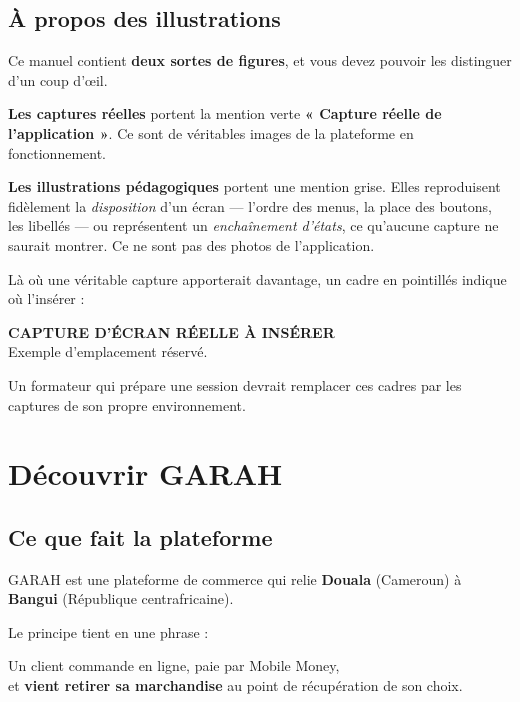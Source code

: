 \documentclass[11pt,a4paper]{report}
\newcommand{\captureAInserer}[2][3.4cm]{%
  \begin{center}
  \begin{tcolorbox}[width=\linewidth,height=#1,
    colback=garahFond,colframe=garahAttenue,boxrule=0.9pt,arc=4pt,
    halign=center,valign=center]
    {\small\bfseries\color{garahAttenue}CAPTURE D'ÉCRAN RÉELLE À INSÉRER}\\[4pt]
    {\footnotesize\color{garahAttenue}#2}
  \end{tcolorbox}
  \end{center}
}
\begin{document}
\section*{À propos des illustrations}

\begin{attention}
Ce manuel contient \textbf{deux sortes de figures}, et vous devez pouvoir les
distinguer d'un coup d'œil.

\medskip
\textbf{Les captures réelles} portent la mention verte
\textcolor{garahSlogan}{\bfseries « Capture réelle de l'application »}. Ce
sont de véritables images de la plateforme en fonctionnement.

\medskip
\textbf{Les illustrations pédagogiques} portent une mention grise. Elles
reproduisent fidèlement la \emph{disposition} d'un écran — l'ordre des menus,
la place des boutons, les libellés — ou représentent un \emph{enchaînement
d'états}, ce qu'aucune capture ne saurait montrer. Ce ne sont pas des photos
de l'application.

Là où une véritable capture apporterait davantage, un cadre en pointillés
indique où l'insérer :

\captureAInserer[6em]{Exemple d'emplacement réservé.}

Un formateur qui prépare une session devrait remplacer ces cadres par les
captures de son propre environnement.
\end{attention}

\chapter{Découvrir GARAH}
\label{ch:decouvrir}

\section{Ce que fait la plateforme}

GARAH est une plateforme de commerce qui relie \textbf{Douala} (Cameroun) à
\textbf{Bangui} (République centrafricaine).

Le principe tient en une phrase :

\begin{center}
\begin{tcolorbox}[width=0.9\linewidth,colback=garahMarque!8,
  colframe=garahMarque,arc=4pt,boxrule=1pt]
\centering\large
Un client commande en ligne, paie par Mobile Money,\\
et \textbf{vient retirer sa marchandise} au point de récupération de son choix.
\end{tcolorbox}
\end{center}
\end{document}
